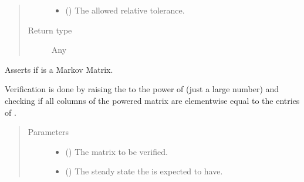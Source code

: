 \documentclass[letterpaper,10pt,english]{sphinxmanual}
\begin{document}
\begin{fulllineitems}
\begin{fulllineitems}
\begin{quote}
\begin{description}
\begin{itemize}
\item {} 
 () \textendash{} The allowed relative tolerance.

\end{itemize}

\item[{Return type}] \leavevmode
Any

\end{description}\end{quote}

\end{fulllineitems}


\begin{fulllineitems}
\label{\detokenize{app.domain:app.domain.cluster_groups.SGCluster._validate_transition_matrix}}
Asserts if  is a Markov Matrix.

Verification is done by raising the  to the power
of  (just a large number) and checking if all columns of the
powered matrix are element\sphinxhyphen{}wise equal to the
entries of .
\begin{quote}\begin{description}
\item[{Parameters}] \leavevmode\begin{itemize}
\item {} 
 () \textendash{} The matrix to be verified.

\item {} 
 () \textendash{} The steady state the  is expected to have.

\end{itemize}


\end{description}
\end{quote}
\end{fulllineitems}
\end{fulllineitems}
\end{document}
